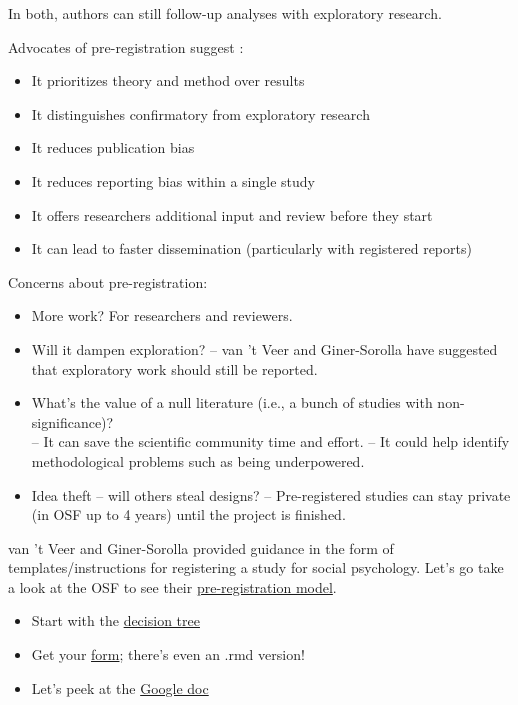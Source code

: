 \documentclass[
  english,
]{book}
\providecommand{\tightlist}{%
  \setlength{\itemsep}{0pt}\setlength{\parskip}{0pt}}
\begin{document}
In both, authors can still follow-up analyses with exploratory research.

Advocates of pre-registration suggest \citep{van_t_veer_pre-registration_2016}:

\begin{itemize}
\tightlist
\item
  It prioritizes theory and method over results
\item
  It distinguishes confirmatory from exploratory research
\item
  It reduces publication bias
\item
  It reduces reporting bias within a single study
\item
  It offers researchers additional input and review before they start
\item
  It can lead to faster dissemination (particularly with registered reports)
\end{itemize}

Concerns about pre-registration:

\begin{itemize}
\tightlist
\item
  More work? For researchers and reviewers.
\item
  Will it dampen exploration? -- van 't Veer and Giner-Sorolla \citeyearpar{van_t_veer_pre-registration_2016} have suggested that exploratory work should still be reported.
\item
  What's the value of a null literature (i.e., a bunch of studies with non-significance)?\\
  -- It can save the scientific community time and effort.
  -- It could help identify methodological problems such as being underpowered.
\item
  Idea theft -- will others steal designs?
  -- Pre-registered studies can stay private (in OSF up to 4 years) until the project is finished.
\end{itemize}

van 't Veer and Giner-Sorolla \citeyearpar{van_t_veer_pre-registration_2016} provided guidance in the form of templates/instructions for registering a study for social psychology. Let's go take a look at the OSF to see their \href{https://help.osf.io/hc/en-us}{pre-registration model}.

\begin{itemize}
\tightlist
\item
  Start with the \href{https://help.osf.io/hc/en-us/articles/360019738794-Understand-Registration-Forms}{decision tree}
\item
  Get your \href{https://osf.io/zab38/wiki/home/}{form}; there's even an .rmd version!\\
\item
  Let's peek at the \href{https://docs.google.com/document/d/1DaNmJEtBy04bq1l5OxS4JAscdZEkUGATURWwnBKLYxk/edit?pli=1}{Google doc}
\end{itemize}
\end{document}
